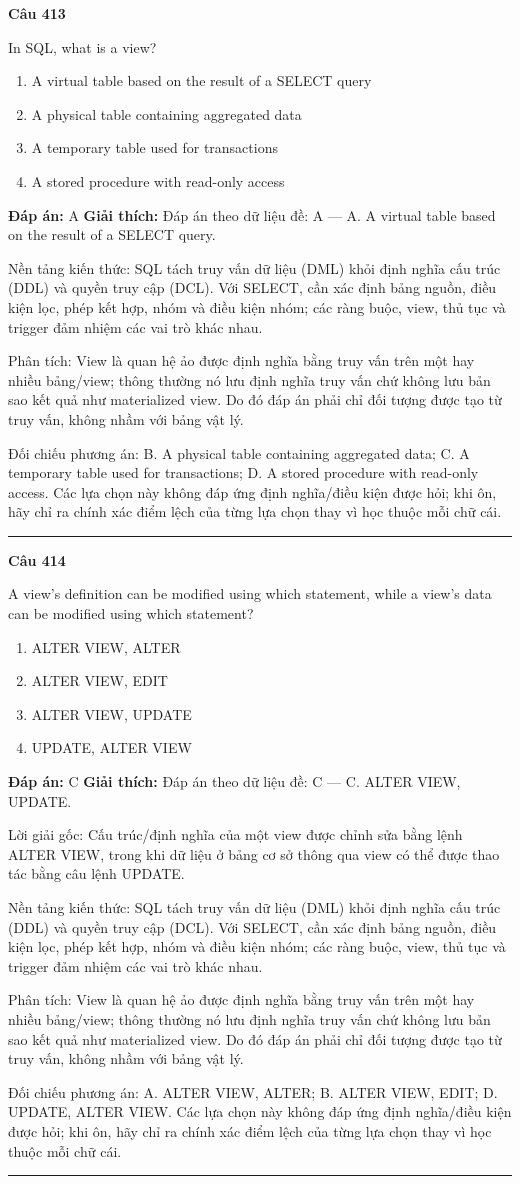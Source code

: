 \documentclass[11pt,a4paper]{article}
\newenvironment{question}[1]{%
  \par\vspace{1em}\noindent\textbf{\large Câu #1}\par\vspace{0.4em}
}{%
  \par\vspace{1em}\hrule\vspace{0.6em}
}
\newenvironment{choices}{%
  \begin{enumerate}[label=\textbf{\Alph*.},leftmargin=2.2em,itemsep=2pt,topsep=3pt]
}{%
  \end{enumerate}
}
\newcommand{\choice}{\item}
\begin{document}
\begin{question}{413}
In SQL, what is a view?
\begin{choices}
\choice A virtual table based on the result of a SELECT query
\choice A physical table containing aggregated data
\choice A temporary table used for transactions
\choice A stored procedure with read-only access
\end{choices}
\textbf{Đáp án:} A
\textbf{Giải thích:} Đáp án theo dữ liệu đề: A — A. A virtual table based on the result of a SELECT query.

Nền tảng kiến thức: SQL tách truy vấn dữ liệu (DML) khỏi định nghĩa cấu trúc (DDL) và quyền truy cập (DCL). Với SELECT, cần xác định bảng nguồn, điều kiện lọc, phép kết hợp, nhóm và điều kiện nhóm; các ràng buộc, view, thủ tục và trigger đảm nhiệm các vai trò khác nhau.

Phân tích: View là quan hệ ảo được định nghĩa bằng truy vấn trên một hay nhiều bảng/view; thông thường nó lưu định nghĩa truy vấn chứ không lưu bản sao kết quả như materialized view. Do đó đáp án phải chỉ đối tượng được tạo từ truy vấn, không nhầm với bảng vật lý.

Đối chiếu phương án: B. A physical table containing aggregated data; C. A temporary table used for transactions; D. A stored procedure with read-only access. Các lựa chọn này không đáp ứng định nghĩa/điều kiện được hỏi; khi ôn, hãy chỉ ra chính xác điểm lệch của từng lựa chọn thay vì học thuộc mỗi chữ cái.
\end{question}

\begin{question}{414}
A view's definition can be modified using which statement, while a view's data can be modified using which statement?
\begin{choices}
\choice ALTER VIEW, ALTER
\choice ALTER VIEW, EDIT
\choice ALTER VIEW, UPDATE
\choice UPDATE, ALTER VIEW
\end{choices}
\textbf{Đáp án:} C
\textbf{Giải thích:} Đáp án theo dữ liệu đề: C — C. ALTER VIEW, UPDATE.

Lời giải gốc: Cấu trúc/định nghĩa của một view được chỉnh sửa bằng lệnh ALTER VIEW, trong khi dữ liệu ở bảng cơ sở thông qua view có thể được thao tác bằng câu lệnh UPDATE.

Nền tảng kiến thức: SQL tách truy vấn dữ liệu (DML) khỏi định nghĩa cấu trúc (DDL) và quyền truy cập (DCL). Với SELECT, cần xác định bảng nguồn, điều kiện lọc, phép kết hợp, nhóm và điều kiện nhóm; các ràng buộc, view, thủ tục và trigger đảm nhiệm các vai trò khác nhau.

Phân tích: View là quan hệ ảo được định nghĩa bằng truy vấn trên một hay nhiều bảng/view; thông thường nó lưu định nghĩa truy vấn chứ không lưu bản sao kết quả như materialized view. Do đó đáp án phải chỉ đối tượng được tạo từ truy vấn, không nhầm với bảng vật lý.

Đối chiếu phương án: A. ALTER VIEW, ALTER; B. ALTER VIEW, EDIT; D. UPDATE, ALTER VIEW. Các lựa chọn này không đáp ứng định nghĩa/điều kiện được hỏi; khi ôn, hãy chỉ ra chính xác điểm lệch của từng lựa chọn thay vì học thuộc mỗi chữ cái.
\end{question}
\end{document}

